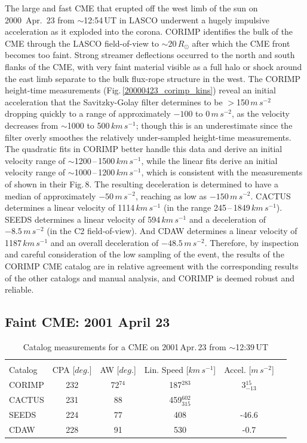 \documentclass[referee,a4paper,12pt,traditabstract]{swsc}
\begin{document}
\begin{linenumbers}
The large and fast CME that erupted off the west limb of the sun on 2000~Apr.~23 from $\sim$12:54\,UT in LASCO underwent a hugely impulsive acceleration as it exploded into the corona. CORIMP identifies the bulk of the CME through the LASCO field-of-view to $\sim$20\,$R_\odot$ after which the CME front becomes too faint. Strong streamer deflections occurred to the north and south flanks of the CME, with very faint material visible as a full halo or shock around the east limb separate to the bulk flux-rope structure in the west. The CORIMP height-time measurements (Fig.\,\ref{20000423_corimp_kins}) reveal an initial acceleration that the Savitzky-Golay filter determines to be $>$150\,$m\,s^{-2}$ dropping quickly to a range of approximately $-100$ to 0\,$m\,s^{-2}$, as the velocity decreases from $\sim$1000 to 500\,$km\,s^{-1}$; though this is an underestimate since the filter overly smoothes the relatively under-sampled height-time measurements. The quadratic fits in CORIMP better handle this data and derive an initial velocity range of $\sim$1200\,--\,1500\,$km\,s^{-1}$, while the linear fits derive an initial velocity range of $\sim$1000\,--\,1200\,$km\,s^{-1}$, which is consistent with the measurements of \cite{2009A&A...495..325B} shown in their Fig.\,8. The resulting deceleration is determined to have a median of approximately $-50\,m\,s^{-2}$, reaching as low as $-150\,m\,s^{-2}$. CACTUS determines a linear velocity of 1114$\,km\,s^{-1}$ (in the range 245\,--\,1849\,$km\,s^{-1}$). SEEDS determines a linear velocity of 594\,$km\,s^{-1}$ and a deceleration of $-8.5\,m\,s^{-2}$ (in the C2 field-of-view). And CDAW determines a linear velocity of 1187$\,km\,s^{-1}$ and an overall deceleration of $-48.5\,m\,s^{-2}$. Therefore, by inspection and careful consideration of the low sampling of the event, the results of the CORIMP CME catalog are in relative agreement with the corresponding results of the other catalogs and manual analysis, and CORIMP is deemed robust and reliable.


\subsection{Faint CME: 2001 April 23}
\label{sect_20010423}

\begin{table}[h]
\begin{tabular}{l*{4}{c}r}
\multicolumn{5}{c}{} \\

Catalog              & CPA [$deg.$] & AW [$deg.$] & Lin. Speed [$km\,s^{-1}$] & Accel. [$m\,s^{-2}$]  \\
\hline
CORIMP   & 232 & 72$^{74}$ & 187$^{283}$ & 3$_{-13}^{15}$ \\
CACTUS  & 231 & 88 & 459$_{315}^{602}$ &  \\
SEEDS    & 224 & 77 & 408 & -46.6  \\
CDAW      & 228 & 91 & 530 & -0.7 \\
\end{tabular}
\caption{Catalog measurements for a CME on 2001\,Apr.\,23 from $\sim$12:39\,UT}
\label{table_20010423}
\end{table}


\end{linenumbers}
\end{document}
